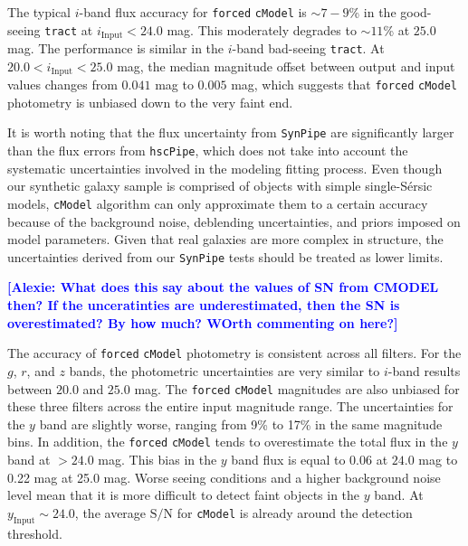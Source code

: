 \documentclass[useamsfonts]{pasj01}
\def\ser{{S\'{e}rsic\ }}
\newcommand{\alexie}[1]{\textcolor{blue}{\textbf{[Alexie: #1]}}}
\def\hscpipe{\texttt{hscPipe}}
\def\synpipe{\texttt{SynPipe}}
\def\cmodel{\texttt{cModel}}
\def\forced{\texttt{forced}}
\def\tract{\texttt{tract}}
\def\s2n{{$\mathrm{S}/\mathrm{N}$}}
\newcommand{\plus}{\raisebox{.4\height}{\scalebox{.6}{+}}}
\newcommand{\minus}{\raisebox{.4\height}{\scalebox{.8}{-}}}
\begin{document}
The typical $i$-band flux accuracy for \forced{} \cmodel{} is ${\sim}7-9$\% in the good-seeing \tract{} at $i_{\mathrm{Input}}<24.0$ mag. This moderately degrades to ${\sim}11$\% at $25.0$ mag. The performance is similar in the $i$-band bad-seeing \tract{}. At $20.0 < i_{\mathrm{Input}} < 25.0$ mag, the median magnitude offset
    between output and input values changes from \plus{}$0.041$ mag to
    \minus{}$0.005$ mag, which suggests that \forced{} \cmodel{} photometry is
    unbiased down to the very faint end.
    
    It is worth noting that the flux uncertainty from \synpipe{} are significantly 
    larger than the flux errors from \hscpipe{}, which does not take into account the 
    systematic uncertainties involved in the modeling fitting process. Even though our synthetic galaxy sample is  comprised of objects with simple single-\ser{} models, 
    \cmodel{} algorithm can only approximate them to a certain accuracy because of the background noise, deblending uncertainties, and priors imposed on model parameters. Given that real galaxies are more complex in structure, the uncertainties derived from our \synpipe{} tests should be treated as lower limits.

\alexie{What does this say about the values of SN from CMODEL then? If the unceratinties are underestimated, then the SN is overestimated? By how much? WOrth commenting on here?}


    The accuracy of \forced{} \cmodel{} photometry is consistent across all filters.
    For the$g$, $r$, and $z$ bands, the photometric uncertainties are very similar to
    $i$-band results between $20.0$ and $25.0$ mag.
    The \forced{} \cmodel{} magnitudes are also unbiased for these three filters
    across the entire input magnitude range.
    The uncertainties for the $y$ band are slightly worse, ranging from 9\% to 17\% in the
    same magnitude bins.
    In addition, the \forced{} \cmodel{} tends to overestimate the total flux in 
    the $y$ band at $>24.0$ mag. This bias in the $y$ band flux is equal to  \minus{}0.06 at $24.0$ mag to \minus{}0.22
    mag at 25.0 mag. Worse seeing conditions and a  higher background noise level mean that it is more
    difficult to detect faint objects in the $y$ band.
    At $y_{\mathrm{Input}}{\sim}24.0$, the average \s2n{} for \cmodel{} is already
    around the detection threshold.
\end{document}
